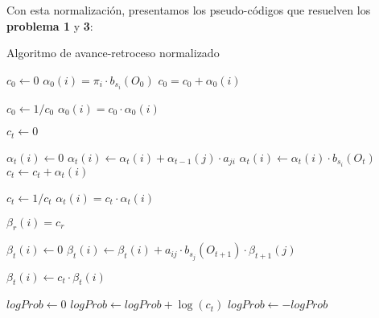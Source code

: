 Con esta normalización, presentamos los pseudo-códigos que resuelven los \textbf{problema 1} y \textbf{3}: \medskip
\begin{breakablealgorithm}
\caption{Algoritmo de avance-retroceso normalizado} \label{PseudocódigoForwardBackwardNormalizado}

\begin{algorithmic}[1]

    \State $c_0 \gets 0$
        \State $\alpha_0(i)=\pi_i\cdot b_{s_i}(O_0)$
        \State $c_0=c_0+\alpha_0(i)$
    \EndFor \State

    \State $c_0 \gets 1/c_0$
        \State $\alpha_0(i)=c_0\cdot\alpha_0(i)$
    \EndFor \State
    
    
        \State $c_t \gets 0$
    
            \State $\alpha_t(i) \gets 0$
                \State $\alpha_t(i)\gets\alpha_t(i)+\alpha_{t-1}(j)\cdot a_{ji}$
            \EndFor
            \State $\alpha_t(i) \gets \alpha_t(i)\cdot b_{s_i}(O_t)$\;
            \State $c_t \gets c_t+\alpha_t(i)$
        \EndFor \State
     
        \State $c_t \gets 1/c_t$
            \State $\alpha_t(i)=c_t\cdot\alpha_t(i)$
        \EndFor 
    \EndFor \State
    
        \State $\beta_r(i)=c_r$
    \EndFor \State
    
                \State $\beta_t(i) \gets 0$
                    \State$\beta_t(i)\gets \beta_t(i)+a_{ij}\cdot b_{s_j}(O_{t+1})\cdot\beta_{t+1}(j)$
                \EndFor \State
                
                \State $\beta_t(i) \gets c_t\cdot\beta_t(i)$
        \EndFor
    \EndFor \State
    
    \State $logProb\gets0$
        \State $logProb\gets logProb+\log(c_t)$
    \EndFor
    \State $logProb\gets-logProb$
\end{algorithmic}
\end{breakablealgorithm}


